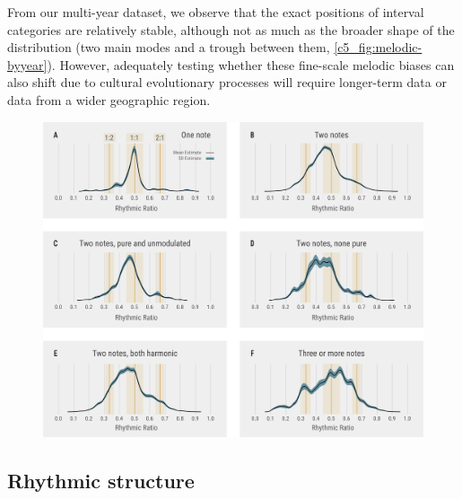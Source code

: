 From our multi-year dataset, we observe that the exact positions of interval categories are relatively stable, although not as much as the broader shape of the distribution (two main modes and a trough between them, \autoref{c5_fig:melodic-byyear}). However, adequately testing whether these fine-scale melodic biases can also shift due to cultural evolutionary processes will require longer-term data or data from a wider geographic region.


\begin{figure}[ht!]
    \centering
    \includegraphics[width=\linewidth]{figures/chapter_5/rhythmic-songtypes.pdf}
    \label{c5_fig:rhythmic-songtypes}
\end{figure}


\subsection{Rhythmic structure}

